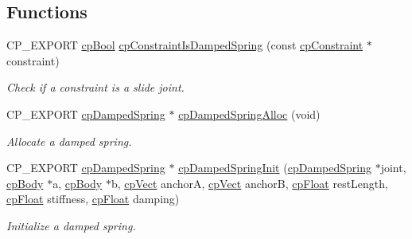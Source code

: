 \subsection*{Functions}
\begin{DoxyCompactItemize}
\item 
\mbox{\label{group__cp_damped_spring_gad543406dd5555ccca55f3eb254a60e58}} 
C\+P\+\_\+\+E\+X\+P\+O\+RT \mbox{\hyperlink{group__basic_types_gabc5e752c48f3449ca26ef413ecbd647e}{cp\+Bool}} \mbox{\hyperlink{group__cp_damped_spring_gad543406dd5555ccca55f3eb254a60e58}{cp\+Constraint\+Is\+Damped\+Spring}} (const \mbox{\hyperlink{structcp_constraint}{cp\+Constraint}} $\ast$constraint)
\begin{DoxyCompactList}\small\item\em Check if a constraint is a slide joint. \end{DoxyCompactList}\item 
\mbox{\label{group__cp_damped_spring_gacfa5d4a4b4a3d1c9309362375377e89b}} 
C\+P\+\_\+\+E\+X\+P\+O\+RT \mbox{\hyperlink{structcp_damped_spring}{cp\+Damped\+Spring}} $\ast$ \mbox{\hyperlink{group__cp_damped_spring_gacfa5d4a4b4a3d1c9309362375377e89b}{cp\+Damped\+Spring\+Alloc}} (void)
\begin{DoxyCompactList}\small\item\em Allocate a damped spring. \end{DoxyCompactList}\item 
\mbox{\label{group__cp_damped_spring_gadffb634d7a8431566ac2066e10fde751}} 
C\+P\+\_\+\+E\+X\+P\+O\+RT \mbox{\hyperlink{structcp_damped_spring}{cp\+Damped\+Spring}} $\ast$ \mbox{\hyperlink{group__cp_damped_spring_gadffb634d7a8431566ac2066e10fde751}{cp\+Damped\+Spring\+Init}} (\mbox{\hyperlink{structcp_damped_spring}{cp\+Damped\+Spring}} $\ast$joint, \mbox{\hyperlink{structcp_body}{cp\+Body}} $\ast$a, \mbox{\hyperlink{structcp_body}{cp\+Body}} $\ast$b, \mbox{\hyperlink{structcp_vect}{cp\+Vect}} anchorA, \mbox{\hyperlink{structcp_vect}{cp\+Vect}} anchorB, \mbox{\hyperlink{group__basic_types_gac1ed65573e035bf892505768c852d8d3}{cp\+Float}} rest\+Length, \mbox{\hyperlink{group__basic_types_gac1ed65573e035bf892505768c852d8d3}{cp\+Float}} stiffness, \mbox{\hyperlink{group__basic_types_gac1ed65573e035bf892505768c852d8d3}{cp\+Float}} damping)
\begin{DoxyCompactList}\small\item\em Initialize a damped spring. \end{DoxyCompactList}\item 

\end{DoxyCompactItemize}
